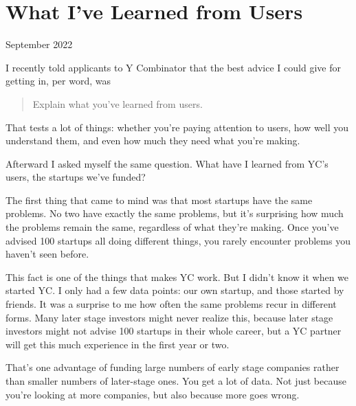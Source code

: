 \chapter{What I've Learned from Users}


            
              
                

September 2022

I recently told applicants to Y
                  Combinator that the best advice I could give for getting in,
                  per word, was
                  \begin{quote}

                    Explain what you've learned from users.
                  
\end{quote}

                  That tests a lot of things: whether you're paying attention to
                  users, how well you understand them, and even how much they
                  need what you're making.

Afterward I asked myself
                  the same question. What have I learned from YC's users, the
                  startups we've funded?

The first thing that came to
                  mind was that most startups have the same problems. No two
                  have exactly the same problems, but it's surprising how much
                  the problems remain the same, regardless of what they're
                  making. Once you've advised 100 startups all doing different
                  things, you rarely encounter problems you haven't seen
                  before.

This fact is one of the things that makes
                  YC work. But I didn't know it when we started YC. I only had a
                  few data points: our own startup, and those started by
                  friends. It was a surprise to me how often the same problems
                  recur in different forms. Many later stage investors might
                  never realize this, because later stage investors might not
                  advise 100 startups in their whole career, but a YC partner
                  will get this much experience in the first year or two.

That's
                  one advantage of funding large numbers of early stage
                  companies rather than smaller numbers of later-stage ones. You
                  get a lot of data. Not just because you're looking at more
                  companies, but also because more goes wrong.

